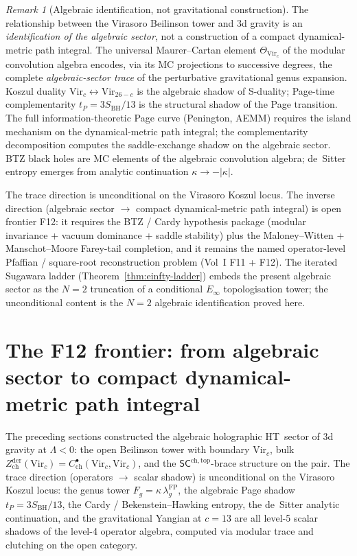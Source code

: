 \documentclass[11pt,reqno]{amsart}
\theoremstyle{definition}
\theoremstyle{remark}
\newtheorem{remark}[theorem]{Remark}
\providecommand{\Vir}{\mathrm{Vir}}
\begin{document}
\begin{remark}[Algebraic identification, not gravitational construction]
\label{rem:climax-identity}
The relationship between the Virasoro Beilinson tower and 3d
gravity is an \emph{identification of the algebraic sector}, not a
construction of a compact dynamical-metric path integral. The
universal Maurer--Cartan element $\Theta_{\Vir_c}$ of the modular
convolution algebra encodes, via its MC projections to successive
degrees, the complete \emph{algebraic-sector trace} of the
perturbative gravitational genus expansion. Koszul duality
$\Vir_c \leftrightarrow \Vir_{26-c}$ is the algebraic shadow of
S-duality; Page-time complementarity $t_P = 3 S_{\mathrm{BH}}/13$ is
the structural shadow of the Page transition. The full
information-theoretic Page curve (Penington, AEMM) requires the
island mechanism on the dynamical-metric path integral; the
complementarity decomposition computes the saddle-exchange shadow
on the algebraic sector. BTZ black holes are MC elements of the
algebraic convolution algebra; de~Sitter entropy emerges from
analytic continuation $\kappa \to -|\kappa|$.

The trace direction is unconditional on the Virasoro Koszul locus.
The inverse direction (algebraic sector $\to$ compact
dynamical-metric path integral) is open frontier F12: it requires
the BTZ / Cardy hypothesis package (modular invariance + vacuum
dominance + saddle stability) plus the Maloney--Witten +
Manschot--Moore Farey-tail completion, and it remains the named
operator-level Pfaffian / square-root reconstruction problem (Vol~I
F11 + F12). The iterated Sugawara ladder
(Theorem~\ref{thm:einfty-ladder}) embeds the present algebraic
sector as the $N = 2$ truncation of a conditional $E_\infty$
topologisation tower; the unconditional content is the $N = 2$
algebraic identification proved here.
\end{remark}


\section{The F12 frontier: from algebraic sector to compact dynamical-metric path integral}
\label{sec:f12-frontier}

The preceding sections constructed the algebraic holographic
HT~sector of 3d gravity at $\Lambda < 0$: the open Beilinson tower
with boundary $\Vir_c$, bulk $Z^{\mathrm{der}}_{\mathrm{ch}}(\Vir_c)
=C^\bullet_{\mathrm{ch}}(\Vir_c,\Vir_c)$, and the
$\mathsf{SC}^{\mathrm{ch,top}}$-brace structure on the pair. The
trace direction (operators $\to$ scalar shadow) is unconditional on
the Virasoro Koszul locus: the genus tower
$F_g = \kappa\,\lambda_g^{\mathrm{FP}}$, the algebraic Page shadow
$t_P = 3 S_{\mathrm{BH}}/13$, the Cardy / Bekenstein--Hawking entropy,
the de~Sitter analytic continuation, and the gravitational Yangian
at $c = 13$ are all level-5 scalar shadows of the level-4 operator
algebra, computed via modular trace and clutching on the open
category.
\end{document}
